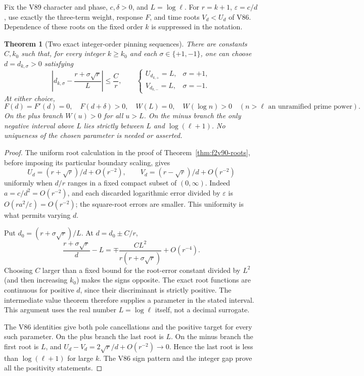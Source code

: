 \documentclass[11pt]{article}
\newtheorem{theorem}{Theorem}[section]
\theoremstyle{definition}
\theoremstyle{remark}
\begin{document}
Fix the V89 character and phase, \(c,\delta>0\), and
\(L=\log\ell\).  For \(r=k+1\), \(\varepsilon=c/d\), use
exactly the three-term weight, response \(F\), and time roots
\(V_d<U_d\) of V86.  Dependence of these roots on the fixed order
\(k\) is suppressed in the notation.

\begin{theorem}[Two exact integer-order pinning sequences]
\label{thm:f2v91-existence}
There are constants \(C,k_0\) such that, for every integer
\(k\ge k_0\) and each \(\sigma\in\{+1,-1\}\), one can choose
\(d=d_{k,\sigma}>0\) satisfying
\begin{equation}
 \left|d_{k,\sigma}-\frac{r+\sigma\sqrt r}{L}\right|
 \le \frac C r,
 \qquad
 \begin{cases}
 U_{d_{k,+}}=L,&\sigma=+1,\\
 V_{d_{k,-}}=L,&\sigma=-1.
 \end{cases}
 \label{eq:f2v91-pinning}
\end{equation}
At either choice,
\begin{equation}
 F(d)=F'(d)=0,\quad F(d+\delta)>0,\quad W(L)=0,
 \quad W(\log n)>0\quad
 (n>\ell\text{ an unramified prime power}).
 \label{eq:f2v91-constraints}
\end{equation}
On the plus branch \(W(u)>0\) for all \(u>L\).  On the minus
branch the only negative interval above \(L\) lies strictly between
\(L\) and \(\log(\ell+1)\).  No uniqueness of the chosen parameter
is needed or asserted.
\end{theorem}

\begin{proof}
The uniform root calculation in the proof of
Theorem~\ref{thm:f2v90-roots}, before imposing its particular boundary
scaling, gives
\[
 U_d=(r+\sqrt r)/d+O(r^{-2}),\qquad
 V_d=(r-\sqrt r)/d+O(r^{-2})
\]
uniformly when \(d/r\) ranges in a fixed compact subset of
\((0,\infty)\).  Indeed \(a=c/d^2=O(r^{-2})\), and each
discarded logarithmic error divided by \(\varepsilon\) is
\(O(r a^2/\varepsilon)=O(r^{-2})\); the square-root errors are
smaller.  This uniformity is what permits varying \(d\).

Put \(d_0=(r+\sigma\sqrt r)/L\).  At
\(d=d_0\pm C/r\),
\[
 \frac{r+\sigma\sqrt r}{d}-L
 =\mp\frac{CL^2}{r(r+\sigma\sqrt r)}+O(r^{-4}).
\]
Choosing \(C\) larger than a fixed bound for the root-error constant
divided by \(L^2\) (and then increasing \(k_0\)) makes the signs
opposite.  The exact root functions are continuous for positive \(d\),
since their discriminant is strictly positive.  The intermediate value
theorem therefore supplies a parameter in the stated interval.  This
argument uses the real number \(L=\log\ell\) itself, not a decimal
surrogate.

The V86 identities give both pole cancellations and the positive
target for every such parameter.  On the plus branch the last root is
\(L\).  On the minus branch the first root is \(L\), and
\(U_d-V_d=2\sqrt r/d+O(r^{-2})\to0\).  Hence the last root is
less than \(\log(\ell+1)\) for large \(k\).  The V86 sign pattern
and the integer gap prove all the positivity statements.
\end{proof}
\end{document}
